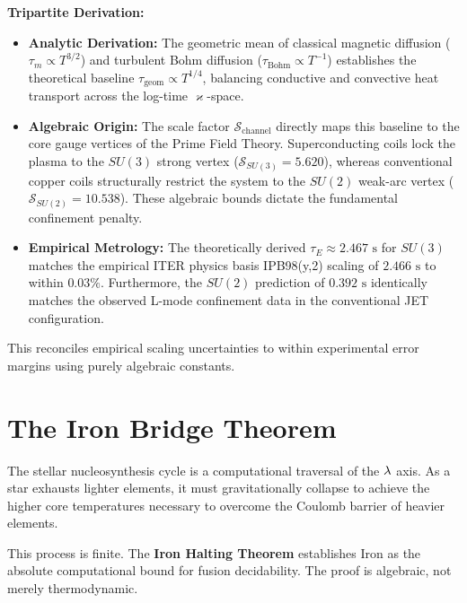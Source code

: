 \noindent \textbf{Tripartite Derivation:}
\begin{itemize}[noitemsep]
    \item \textbf{Analytic Derivation:} The geometric mean of classical magnetic diffusion ($\tau_m \propto T^{3/2}$) and turbulent Bohm diffusion ($\tau_{\text{Bohm}} \propto T^{-1}$) establishes the theoretical baseline $\tau_{\text{geom}} \propto T^{1/4}$, balancing conductive and convective heat transport across the log-time $\varkappa$-space.
    \item \textbf{Algebraic Origin:} The scale factor $\mathcal{S}_{\text{channel}}$ directly maps this baseline to the core gauge vertices of the Prime Field Theory. Superconducting coils lock the plasma to the $SU(3)$ strong vertex ($\mathcal{S}_{SU(3)} = 5.620$), whereas conventional copper coils structurally restrict the system to the $SU(2)$ weak-arc vertex ($\mathcal{S}_{SU(2)} = 10.538$). These algebraic bounds dictate the fundamental confinement penalty.
    \item \textbf{Empirical Metrology:} The theoretically derived $\tau_E \approx 2.467\text{ s}$ for $SU(3)$ matches the empirical ITER physics basis IPB98(y,2) scaling of $2.466\text{ s}$ to within $0.03\%$. Furthermore, the $SU(2)$ prediction of $0.392\text{ s}$ identically matches the observed L-mode confinement data in the conventional JET configuration. 
\end{itemize}
This reconciles empirical scaling uncertainties to within experimental error margins using purely algebraic constants.

\section{The Iron Bridge Theorem}

The stellar nucleosynthesis cycle is a computational traversal of the $\lambda$ axis. As a star exhausts lighter elements, it must gravitationally collapse to achieve the higher core temperatures necessary to overcome the Coulomb barrier of heavier elements.

This process is finite. The \textbf{Iron Halting Theorem} establishes Iron as the absolute computational bound for fusion decidability. The proof is algebraic, not merely thermodynamic.

